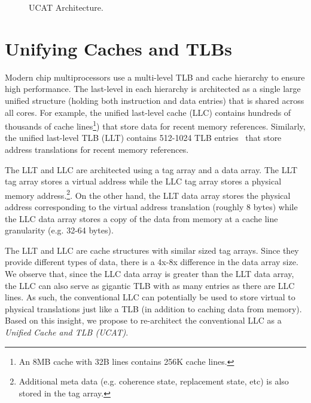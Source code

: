 \begin{figure*}[tp] 
\vspace{-0. in}
\centering
\centerline{}
\caption{\small UCAT Architecture. \normalsize}
\label{fig:pagetable_placement} 
\vspace{-0.0in}
\end{figure*}

\section{Unifying Caches and TLBs}
\label{sec:UCAT}

\noindent Modern chip multiprocessors use a multi-level TLB and cache
hierarchy to ensure high performance. The last-level in each hierarchy
is architected as a single large unified structure (holding both
instruction and data entries) that is shared across all cores. For
example, the unified last-level cache (LLC) contains hundreds
of thousands of cache lines\footnote{An 8MB cache with 32B lines contains
256K cache lines.}) that store data for recent memory references.
Similarly, the unified last-level TLB (LLT) contains 512-1024 TLB
entries~\cite{} that store address translations for recent memory
references.

The LLT and LLC are architected using a tag array and a data array.
The LLT tag array stores a virtual address while the LLC tag array
stores a physical memory address.\footnote{Additional meta data (e.g.
coherence state, replacement state, etc) is also stored in the tag
array.}. On the other hand, the LLT data array stores the physical
address corresponding to the virtual address translation (roughly 8
bytes) while the LLC data array stores a copy of the data from memory
at a cache line granularity (e.g. 32-64 bytes).

The LLT and LLC are cache structures with similar sized tag arrays.
Since they provide different types of data, there is a 4x-8x
difference in the data array size. We observe that, since the LLC data
array is greater than the LLT data array, the LLC can also serve as
gigantic TLB with as many entries as there are LLC lines. 
As such, the conventional LLC can potentially be used to store virtual to physical
translations just like a TLB (in addition to caching data from
memory). Based on this insight, we propose to re-architect the
conventional LLC as a {\em Unified Cache and TLB (UCAT)}.

